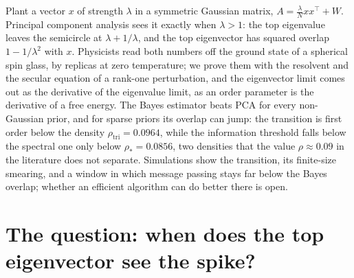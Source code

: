 \newcommand{\spikedGOE}{\mathrm{GOE}}
\newcommand{\spikedmmse}{\mathrm{mmse}}
\newcommand{\spikedsc}{\sigma_{\mathrm{sc}}}
\newcommand{\spikedIT}{\lambda_{\mathrm{IT}}}
\newcommand{\spikedalg}{\lambda_{\mathrm{alg}}}
\newcommand{\spikeddyn}{\lambda_{\mathrm{dyn}}}

\begin{refsection}

\begin{chaptersummary}
Plant a vector $x$ of strength $\lambda$ in a symmetric Gaussian matrix, $A=\frac\lambda Nxx^\top+W$. Principal component analysis sees it exactly when $\lambda>1$: the top eigenvalue leaves the semicircle at $\lambda+1/\lambda$, and the top eigenvector has squared overlap $1-1/\lambda^2$ with $x$. Physicists read both numbers off the ground state of a spherical spin glass, by replicas at zero temperature; we prove them with the resolvent and the secular equation of a rank-one perturbation, and the eigenvector limit comes out as the derivative of the eigenvalue limit, as an order parameter is the derivative of a free energy. The Bayes estimator beats PCA for every non-Gaussian prior, and for sparse priors its overlap can jump: the transition is first order below the density $\rho_{\mathrm{tri}}=0.0964$, while the information threshold falls below the spectral one only below $\rho_*=0.0856$, two densities that the value $\rho\approx0.09$ in the literature does not separate. Simulations show the transition, its finite-size smearing, and a window in which message passing stays far below the Bayes overlap; whether an efficient algorithm can do better there is open.
\end{chaptersummary}

\section{The question: when does the top eigenvector see the spike?}\label{sec:spiked:question}


\end{refsection}

